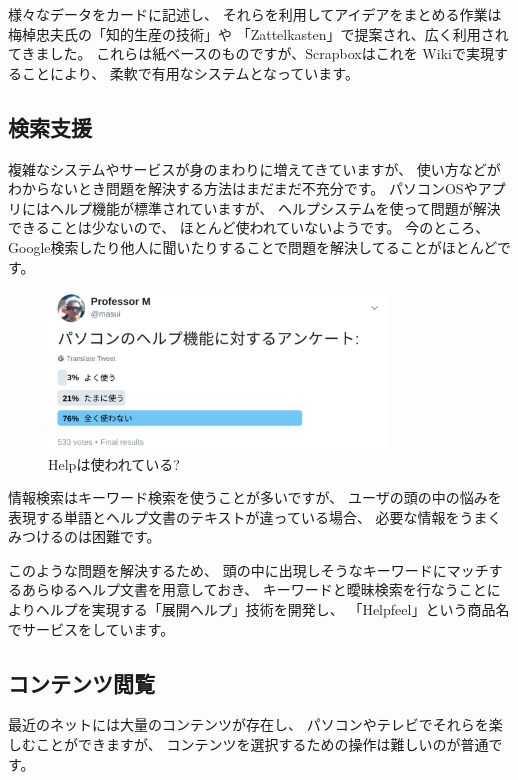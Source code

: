 \documentclass[topics]{compsoft} %
\begin{document}
様々なデータをカードに記述し、
それらを利用してアイデアをまとめる作業は
梅棹忠夫氏の「知的生産の技術」や
「Zattelkasten」で提案され、広く利用されてきました。
これらは紙ベースのものですが、Scrapboxはこれを
Wikiで実現することにより、
柔軟で有用なシステムとなっています。


\subsection{検索支援}

複雑なシステムやサービスが身のまわりに増えてきていますが、
使い方などがわからないとき問題を解決する方法はまだまだ不充分です。
パソコンOSやアプリにはヘルプ機能が標準されていますが、
ヘルプシステムを使って問題が解決できることは少ないので、
ほとんど使われていないようです。
今のところ、Google検索したり他人に聞いたりすることで問題を解決してることがほとんどです。

\begin{figure}[t]
  \includegraphics[width=9cm,bb=0 0 1332 623]{figures/383ee54c265ebbb88778d7ea0fbea5b1.png}
  \caption{Helpは使われている?}
  \label{example1}
\end{figure}


情報検索はキーワード検索を使うことが多いですが、
ユーザの頭の中の悩みを表現する単語とヘルプ文書のテキストが違っている場合、
必要な情報をうまくみつけるのは困難です。

このような問題を解決するため、
頭の中に出現しそうなキーワードにマッチするあらゆるヘルプ文書を用意しておき、
キーワードと曖昧検索を行なうことによりヘルプを実現する「展開ヘルプ」\cite{xxx}技術を開発し、
「Helpfeel」という商品名でサービスをしています。

\subsection{コンテンツ閲覧}

最近のネットには大量のコンテンツが存在し、
パソコンやテレビでそれらを楽しむことができますが、
コンテンツを選択するための操作は難しいのが普通です。
\end{document}
